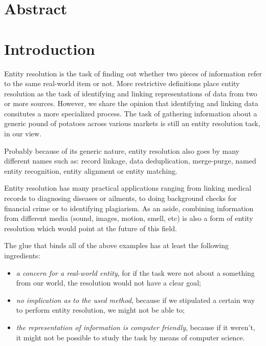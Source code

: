 \documentclass[11pt]{article}
\begin{document}
    \theoremstyle{definition}
    \newtheorem{defn}{Definition}[section]
    
    \section{Abstract}\label{sec:abstract}


    \section{Introduction}\label{sec:introduction}
    Entity resolution is the task of finding out whether two pieces of
    information refer to the same real-world item or not.
    More restrictive definitions place entity resolution as the task of
    identifying and linking representations of data from two or more
    sources\cite{Qia17}.
    However, we share the opinion that identifying and linking data consitutes a
    more specialized process\cite{Tal11}.
    The task of gathering information about a generic pound of potatoes across
    various markets is still an entity resolution task, in our view.
    
    Probably because of its generic nature, entity resolution also goes by many
    different names such as: record linkage, data deduplication, merge-purge,
    named entity recognition, entity alignment or entity
    matching\cite{Tal11,fever2009}.

    Entity resolution has many practical applications ranging from linking
    medical records to diagnosing diseases or ailments, to doing background
    checks for financial crime or to identifying plagiarism.
    As an aside, combining information from different media (sound, images,
    motion, smell, etc) is also a form of entity resolution which would point at
    the future of this field.

    The glue that binds all of the above examples has at least the following
    ingredients:

    \begin{itemize}
        \item\textit{a concern for a real-world entity}, for if the task were
        not about a something from our world, the resolution would not have a
        clear goal;
        \item\textit{no implication as to the used method}, because if we
        stipulated a certain way to perform entity resolution, we might not be
        able to;
        \item\textit{the representation of information is computer friendly},
        because if it weren't, it might not be possible to study the task by
        means of computer science.
    \end{itemize}
\end{document}
